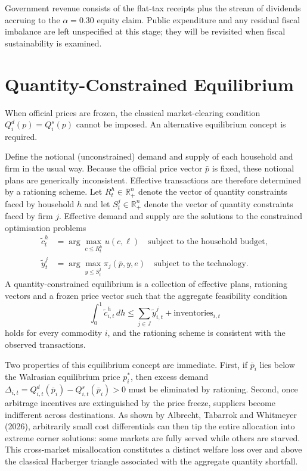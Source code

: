 \documentclass[12pt,anyside]{book}
\theoremstyle{definition}
\theoremstyle{plain}
\theoremstyle{remark}
\begin{document}
Government revenue consists of the flat-tax receipts plus the stream of dividends accruing to the $\alpha=0.30$ equity claim. Public expenditure and any residual fiscal imbalance are left unspecified at this stage; they will be revisited when fiscal sustainability is examined.

\section{Quantity-Constrained Equilibrium}

When official prices are frozen, the classical market-clearing condition $Q_i^d(p)=Q_i^s(p)$ cannot be imposed. An alternative equilibrium concept is required.

Define the notional (unconstrained) demand and supply of each household and firm in the usual way. Because the official price vector $\bar{p}$ is fixed, these notional plans are generically inconsistent. Effective transactions are therefore determined by a rationing scheme. Let $R_t^h\in\mathbb{R}_+^n$ denote the vector of quantity constraints faced by household $h$ and let $S_t^j\in\mathbb{R}_+^n$ denote the vector of quantity constraints faced by firm $j$. Effective demand and supply are the solutions to the constrained optimisation problems
\begin{align}
\tilde{c}_t^h&=\arg\max_{c\le R_t^h}u(c,\ell)\quad\text{subject to the household budget},\\
\tilde{y}_t^j&=\arg\max_{y\le S_t^j}\pi_j(\bar{p},y,e)\quad\text{subject to the technology}.
\end{align}
A quantity-constrained equilibrium is a collection of effective plans, rationing vectors and a frozen price vector such that the aggregate feasibility condition
\begin{equation}
\int_0^1\tilde{c}_{i,t}^h\,dh\le\sum_{j\in J}\tilde{y}_{i,t}^j+\text{inventories}_{i,t}
\end{equation}
holds for every commodity $i$, and the rationing scheme is consistent with the observed transactions.

Two properties of this equilibrium concept are immediate. First, if $\bar{p}_i$ lies below the Walrasian equilibrium price $p_i^*$, then excess demand $\Delta_{i,t}=Q_{i,t}^d(\bar{p}_i)-Q_{i,t}^s(\bar{p}_i)>0$ must be eliminated by rationing. Second, once arbitrage incentives are extinguished by the price freeze, suppliers become indifferent across destinations. As shown by Albrecht, Tabarrok and Whitmeyer (2026), arbitrarily small cost differentials can then tip the entire allocation into extreme corner solutions: some markets are fully served while others are starved. This cross-market misallocation constitutes a distinct welfare loss over and above the classical Harberger triangle associated with the aggregate quantity shortfall.
\end{document}
